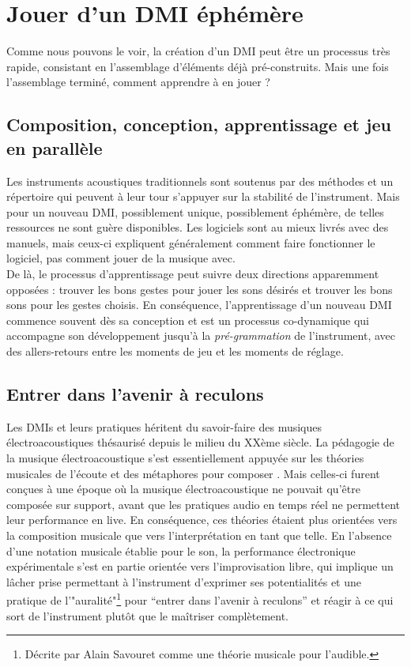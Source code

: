 \section{Jouer d'un DMI éphémère}

\noindent Comme nous pouvons le voir, la création d'un \gls{DMI} peut être un processus très rapide, consistant en l'assemblage d'éléments déjà pré-construits. Mais une fois l'assemblage terminé, comment apprendre à en jouer ?

\subsection{Composition, conception, apprentissage et jeu en parallèle}

\indent Les instruments acoustiques traditionnels sont soutenus par des méthodes et un répertoire qui peuvent à leur tour s'appuyer sur la stabilité de l'instrument. Mais pour un nouveau \gls{DMI}, possiblement unique, possiblement éphémère, de telles ressources ne sont guère disponibles. Les logiciels sont au mieux livrés avec des manuels, mais ceux-ci expliquent généralement comment faire fonctionner le logiciel, pas comment jouer de la musique avec.\\
\indent De là, le processus d'apprentissage peut suivre deux directions apparemment opposées : trouver les bons gestes pour jouer les sons désirés et trouver les bons sons pour les gestes choisis. En conséquence, l'apprentissage d'un nouveau \gls{DMI} commence souvent dès sa conception et est un processus co-dynamique qui accompagne son développement jusqu'à la \textit{pré-grammation} de l'instrument, avec des allers-retours entre les moments de jeu et les moments de réglage.

\subsection{Entrer dans l'avenir à reculons}

\noindent Les \glspl{DMI} et leurs pratiques héritent du savoir-faire des musiques électroacoustiques thésaurisé depuis le milieu du XXème siècle. La pédagogie de la musique électroacoustique s'est essentiellement appuyée sur les théories musicales de l'écoute \cite{schaeffer_traite_1966} et des métaphores pour composer \cite{bayle_musique_1993}. Mais celles-ci furent conçues à une époque où la musique électroacoustique ne pouvait qu'être composée sur support, avant que les pratiques audio en temps réel ne permettent leur performance en live. En conséquence, ces théories étaient plus orientées vers la composition musicale que vers l'interprétation en tant que telle.
\indent En l'absence d'une notation musicale établie pour le son, la performance électronique expérimentale s'est en partie orientée vers l'improvisation libre, qui implique un lâcher prise permettant à l'instrument d'exprimer ses potentialités et une pratique de l'"auralité"\footnote{Décrite par Alain Savouret comme une théorie musicale pour l'audible.} pour ``entrer dans l'avenir à reculons'' \cite{savouret_introduction_2010} et réagir à ce qui sort de l'instrument plutôt que le maîtriser complètement.

